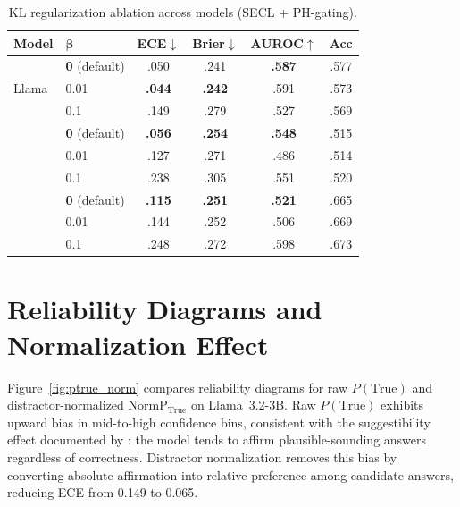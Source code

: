 \begin{table}[h]
\centering
\caption{KL regularization ablation across models (SECL + PH-gating).}
\label{tab:ablation_kl}
\small
\begin{tabular}{@{}llcccc@{}}
\toprule
\textbf{Model} & $\boldsymbol{\beta}$
  & \textbf{ECE}$\downarrow$ & \textbf{Brier}$\downarrow$
  & \textbf{AUROC}$\uparrow$ & \textbf{Acc} \\
\midrule
\multirow{3}{*}{Llama}
  & \textbf{0} (default) & .050 & .241 & \textbf{.587} & .577 \\
  & 0.01     & \textbf{.044} & \textbf{.242} & .591 & .573 \\
  & 0.1      & .149 & .279 & .527 & .569 \\
\addlinespace
\multirow{3}{*}{Gemma}
  & \textbf{0} (default) & \textbf{.056} & \textbf{.254} & \textbf{.548} & .515 \\
  & 0.01     & .127 & .271 & .486 & .514 \\
  & 0.1      & .238 & .305 & .551 & .520 \\
\addlinespace
\multirow{3}{*}{Phi}
  & \textbf{0} (default) & \textbf{.115} & \textbf{.251} & \textbf{.521} & .665 \\
  & 0.01     & .144 & .252 & .506 & .669 \\
  & 0.1      & .248 & .272 & .598 & .673 \\
\bottomrule
\end{tabular}
\end{table}


\section{Reliability Diagrams and Normalization Effect} \label{app:reliability}

Figure~\ref{fig:ptrue_norm} compares reliability diagrams for raw
$P(\text{True})$ and distractor-normalized
$\text{NormP}_{\text{True}}$ on Llama~3.2-3B.
Raw $P(\text{True})$ exhibits upward bias in mid-to-high confidence
bins, consistent with the suggestibility effect documented by
\citet{wang_calibrating_2025}: the model tends to affirm
plausible-sounding answers regardless of correctness.
Distractor normalization removes this bias by converting
absolute affirmation into relative preference among candidate
answers, reducing ECE from 0.149 to 0.065.

